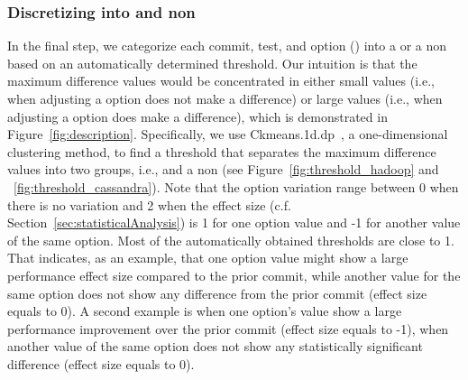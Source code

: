 

\subsubsection{Discretizing \instance into \inconsistent and non \inconsistent}
\label{sec:discretizing}
In the final step, we categorize each commit, test, and option (\instance) into a \inconsistent or a non \inconsistent %
based on an automatically determined threshold. Our intuition is that the maximum difference values would be concentrated in either small values (i.e., when adjusting a option does not make a difference) or large values (i.e., when adjusting a option does make a difference), which is demonstrated in Figure~\ref{fig:description}. %
Specifically, we use Ckmeans.1d.dp~\cite{Ckmeans138:online}, a one-dimensional clustering method, to find a threshold that separates the maximum difference values into two groups, i.e., \inconsistent and a non \inconsistent (see Figure~\ref{fig:threshold_hadoop} and ~\ref{fig:threshold_cassandra}). Note that the option variation range between 0 when there is no variation and 2 when the effect size (c.f. Section~\ref{sec:statisticalAnalysis}) is 1 for one option value and -1 for another value of the same option. Most of the automatically obtained thresholds are close to 1. That indicates, as an example, that one option value might show a large performance effect size compared to the prior commit, while another value for the same option does not show any difference from the prior commit (effect size equals to 0). A second example is when one option's value show a large performance improvement over the prior commit (effect size equals to -1), when another value of the same option does not show any statistically significant difference (effect size equals to 0).

